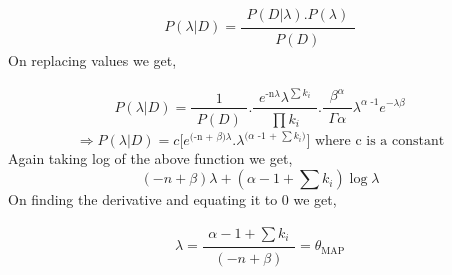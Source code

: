 \documentclass[11pt, a4paper, fleqn]{article}
\begin{document}
\begin{equation*}
P(\lambda|D) = \frac{\substack{P(D|\lambda).P(\lambda) }}{\substack{P(D)}} 
\end{equation*}
On replacing values we get,

\begin{equation*}
P(\lambda|D) = \frac{\substack{1 }}{\substack{P(D)}} . 
\frac{\substack{e^\text{-n$\lambda$} \lambda^\text{$\sum{k_i}$}}}{\substack{\prod{k_i}}} . 
\frac{\substack{\beta^\alpha }}{\substack{\Gamma{\alpha}}} \lambda^\text{$\alpha$ -1} e^\text{$-\lambda\beta$}
\end{equation*}
\begin{equation*}
\Rightarrow 
P(\lambda|D) = c \Big[e^\text{(-n + $\beta$)$\lambda$}. \lambda^\text{($\alpha$ -1 + $\sum{k_i}$)}\Big]
\text{  where c is a constant}
\end{equation*}
Again taking log of the above function we get,
\begin{equation*}
(-n + \beta)\lambda + (\alpha -1 + \sum{k_i}) \log \lambda
\end{equation*}
 On finding the derivative and equating it to 0 we get,

\begin{equation*}
\lambda=\frac{\substack{\alpha -1 + \sum{k_i}}}{\substack{(-n + \beta)}} = \theta_\text{MAP}
\end{equation*}
\end{document}
